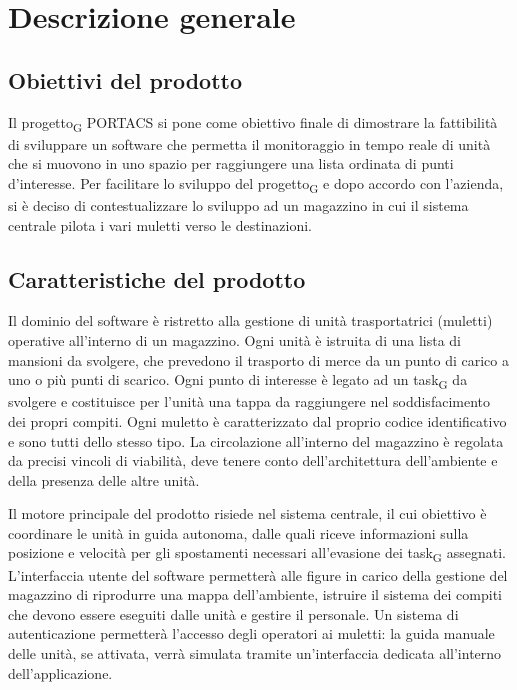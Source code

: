 \section{Descrizione generale}

\subsection{Obiettivi del prodotto}
Il \gls{progetto}\textsubscript{G} PORTACS si pone come obiettivo finale di dimostrare la fattibilità di sviluppare un software che permetta il monitoraggio in tempo reale di unità che si muovono in uno spazio per raggiungere una lista ordinata di punti d’interesse. Per facilitare lo sviluppo del \gls{progetto}\textsubscript{G} e dopo accordo con l'azienda, si è deciso di contestualizzare lo sviluppo ad un magazzino in cui il sistema centrale pilota i vari muletti verso le destinazioni.

\subsection{Caratteristiche del prodotto}
Il dominio del software è ristretto alla gestione di unità trasportatrici (muletti) operative all’interno di un magazzino. Ogni unità è istruita di una lista di mansioni da svolgere, che prevedono il trasporto di merce da un punto di carico a uno o più punti di scarico. Ogni punto di interesse è legato ad un \gls{task}\textsubscript{G} da svolgere e costituisce per l’unità una tappa da raggiungere nel soddisfacimento dei propri compiti. Ogni muletto è caratterizzato dal proprio codice identificativo e sono tutti dello stesso tipo.
La circolazione all’interno del magazzino è regolata da precisi vincoli di viabilità, deve tenere conto dell’architettura dell’ambiente e della presenza delle altre unità.

Il motore principale del prodotto risiede nel sistema centrale, il cui obiettivo è coordinare le unità in guida autonoma, dalle quali riceve informazioni sulla posizione e velocità per gli spostamenti necessari all’evasione dei \gls{task}\textsubscript{G} assegnati. L’interfaccia utente del software permetterà alle figure in carico della gestione del magazzino di riprodurre una mappa dell’ambiente, istruire il sistema dei compiti che devono essere eseguiti dalle unità e gestire il personale. Un sistema di autenticazione permetterà l’accesso degli operatori ai muletti: la guida manuale delle unità, se attivata, verrà simulata tramite un’interfaccia dedicata all’interno dell’applicazione.

